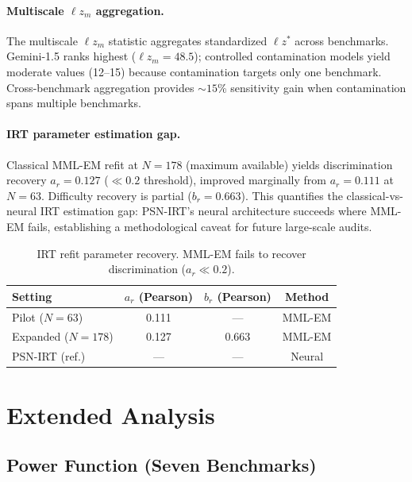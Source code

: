 \documentclass[11pt,a4paper]{article}
\begin{document}
\paragraph{Multiscale $\ell z_m$ aggregation.}
The multiscale $\ell z_m$ statistic aggregates standardized $\ell z^*$ across benchmarks.
Gemini-1.5 ranks highest ($\ell z_m = 48.5$); controlled contamination models yield moderate values (12--15) because contamination targets only one benchmark.
Cross-benchmark aggregation provides ${\sim}15$\% sensitivity gain when contamination spans multiple benchmarks.

\paragraph{IRT parameter estimation gap.}
Classical MML-EM refit at $N{=}178$ (maximum available) yields discrimination recovery $a_r = 0.127$ ($\ll 0.2$ threshold), improved marginally from $a_r = 0.111$ at $N{=}63$.
Difficulty recovery is partial ($b_r = 0.663$).
This quantifies the classical-vs-neural IRT estimation gap: PSN-IRT's neural architecture succeeds where MML-EM fails, establishing a methodological caveat for future large-scale audits.

\begin{table}[h]
\centering
\small
\begin{tabular}{lccc}
\toprule
Setting & $a_r$ (Pearson) & $b_r$ (Pearson) & Method \\
\midrule
Pilot ($N{=}63$) & 0.111 & --- & MML-EM \\
Expanded ($N{=}178$) & 0.127 & 0.663 & MML-EM \\
PSN-IRT (ref.) & --- & --- & Neural \\
\bottomrule
\end{tabular}
\caption{IRT refit parameter recovery. MML-EM fails to recover discrimination ($a_r \ll 0.2$).}
\label{tab:irt_refit}
\end{table}

\section{Extended Analysis}
\label{sec:extended}

\subsection{Power Function (Seven Benchmarks)}
\end{document}
